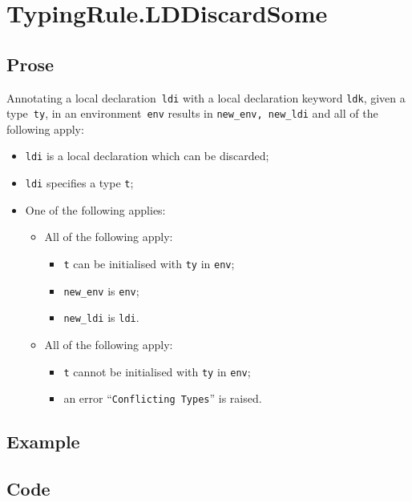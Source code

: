 \documentclass{book}
\begin{document}
\section{TypingRule.LDDiscardSome \label{sec:TypingRule.LDDiscardSome}}

  \subsection{Prose}
    Annotating a local declaration~\texttt{ldi} with a local declaration keyword \texttt{ldk}, given a type~\texttt{ty}, in
an environment~\texttt{env} results in \texttt{new\_env, new\_ldi} and all of
the following apply:
   \begin{itemize}
   \item \texttt{ldi} is a local declaration which can be discarded;
   \item \texttt{ldi} specifies a type \texttt{t};
   \item One of the following applies:
     \begin{itemize}
     \item All of the following apply:
       \begin{itemize}
       \item \texttt{t} can be initialised with \texttt{ty} in \texttt{env};
       \item \texttt{new\_env} is \texttt{env};
       \item \texttt{new\_ldi} is \texttt{ldi}.
       \end{itemize}
     \item All of the following apply:
       \begin{itemize}
       \item \texttt{t} cannot be initialised with \texttt{ty} in \texttt{env};
       \item an error ``\texttt{Conflicting Types}'' is raised.
       \end{itemize}
     \end{itemize}
   \end{itemize}

  \subsection{Example}

  \subsection{Code}
\end{document}

